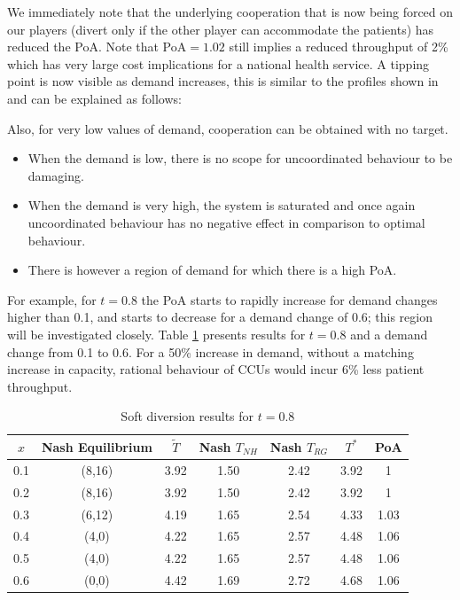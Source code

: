 \documentclass{article}
\begin{document}
We immediately note that the underlying cooperation that is now being forced on our players (divert only if the other player can accommodate the patients) has reduced the PoA.
Note that PoA$=1.02$ still implies a reduced throughput of 2\% which has very large cost implications for a national health service.
A tipping point is now visible as demand increases, this is similar to the profiles shown in \cite{Knight2013} and can be explained as follows:

Also, for very low values of demand, cooperation can be obtained with no target.
\begin{itemize}
    \item When the demand is low, there is no scope for uncoordinated behaviour to be damaging.
    \item When the demand is very high, the system is saturated and once again uncoordinated behaviour has no negative effect in comparison to optimal behaviour.
    \item There is however a region of demand for which there is a high PoA.
\end{itemize}

For example, for $t=0.8$ the PoA starts to rapidly increase for demand changes higher than 0.1, and starts to decrease for a demand change of 0.6; this region will be investigated closely.
Table \ref{table_model2_target_demand} presents results for $t=0.8$ and a demand change from 0.1 to 0.6. For a 50\% increase in demand, without a matching increase in capacity, rational behaviour of CCUs would incur 6\% less patient throughput.

 \begin{table}[!htbp]
\begin{center}
\begin{tabular}{ccccccc}
\toprule
$x$&Nash Equilibrium&$\tilde T$&Nash $T_{NH}$& Nash $T_{RG}$& $T^*$& PoA\\
\midrule
0.1&(8,16)&3.92&1.50&2.42&3.92&1\\
0.2&(8,16)&3.92&1.50&2.42&3.92&1\\
0.3&(6,12)&4.19&1.65&2.54&4.33&1.03\\
0.4&(4,0)&4.22&1.65&2.57&4.48&1.06\\
0.5&(4,0)&4.22&1.65&2.57&4.48&1.06\\
0.6&(0,0)&4.42&1.69&2.72&4.68&1.06\\
\bottomrule
\end{tabular}
\end{center}
\caption{Soft diversion results for $t=0.8$}\label{table_model2_target_demand}
\end{table}
\end{document}
